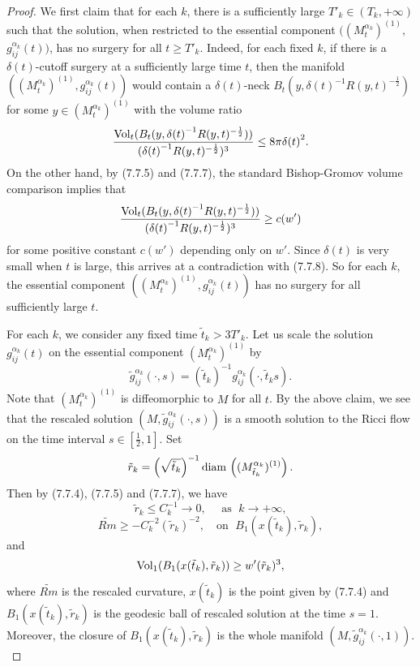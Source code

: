 \begin{proof}
We first claim that for each $k$, there is a sufficiently large
$T'_k \in (T_k,+\infty)$ such that the solution, when restricted
to the essential component $((M^{\alpha_k}_t)^{(1)},$
$g^{\alpha_k}_{ij}(t))$, has no surgery for all $t\geq T'_k$.
Indeed, for each fixed $k$, if there is a $\delta(t)$-cutoff
surgery at a sufficiently large time $t$, then the manifold
$((M^{\alpha_k}_t)^{(1)},g^{\alpha_k}_{ij}(t))$ would contain a
$\delta(t)$-neck $B_t(y,{\delta(t)}^{-1}R(y,t)^{-\frac{1}{2}})$
for some $y \in (M^{\alpha_k}_t)^{(1)}$ with the volume ratio \begin{equation}
\frac{\Vol_t(B_t(y,{\delta(t)}^{-1}
R(y,t)^{-\frac{1}{2}}))}{({\delta(t)}^{-1}R(y,t)^{-\frac{1}{2}})^3}
\leq 8\pi{\delta(t)}^2. %
\end{equation} On the other hand, by (7.7.5) and (7.7.7), the standard
Bishop-Gromov volume comparison implies that
$$
\frac{\operatorname{Vol}_t(B_t(y,{\delta(t)}^{-1}
R(y,t)^{-\frac{1}{2}}))}{({\delta(t)}^{-1}R(y,t)^{-\frac{1}{2}})^3}
\geq c(w')
$$
for some positive constant $c(w')$ depending only on $w'$. Since
$\delta(t)$ is very small when $t$ is large, this arrives at a
contradiction with (7.7.8). So for each $k$, the essential
component $((M^{\alpha_k}_t)^{(1)},g^{\alpha_k}_{ij}(t))$ has no
surgery for all sufficiently large $t$.

For each $k$, we consider any fixed time $\tilde{t}_k > 3 T'_k$.
Let us scale the solution $g^{\alpha_k}_{ij}(t)$ on the essential
component $(M^{\alpha_k}_t)^{(1)}$ by
$$
\tilde{g}^{\alpha_k}_{ij}(\cdot,s) =
(\tilde{t}_{k})^{-1}g^{\alpha_k}_{ij}(\cdot,\tilde{t}_{k}s).
$$
Note that $(M^{\alpha_k}_t)^{(1)}$ is diffeomorphic to $M$ for all
$t$. By the above claim, we see that the rescaled solution
$(M,\tilde{g}^{\alpha_k}_{ij}(\cdot,s))$ is a smooth solution to
the Ricci flow on the time interval $s \in [\frac{1}{2},1]$. Set
$$
\tilde{r}_k = \left(\sqrt{\tilde{t}_k}\right)^{-1} {\rm
diam}\,\left((M^{\alpha_k}_{\tilde{t}_k})^{(1)}\right).
$$
Then by (7.7.4), (7.7.5) and (7.7.7), we have
$$
\tilde{r}_k \leq C^{-1}_k \rightarrow 0, \quad \mbox{ as }\; k
\rightarrow +\infty,
$$
$$
\widetilde{Rm} \geq -C^{-2}_k(\tilde{r}_k)^{-2}, \quad \mbox{on }
\; B_1(x(\tilde{t}_k),\tilde{r}_k),
$$
and
$$
\operatorname{Vol}_1(B_1(x(\tilde{t}_k),\tilde{r}_k)) \geq w'(\tilde{r}_k)^3,
$$
where $\widetilde{Rm}$ is the rescaled curvature, $x(\tilde{t}_k)$
is the point given by (7.7.4) and
$B_1(x(\tilde{t}_k),\tilde{r}_k)$ is the geodesic ball of rescaled
solution at the time $s=1$. Moreover, the closure of
$B_1(x(\tilde{t}_k),\tilde{r}_k)$ is the whole manifold
$(M,\tilde{g}^{\alpha_k}_{ij}(\cdot,1)).$


\end{proof}

